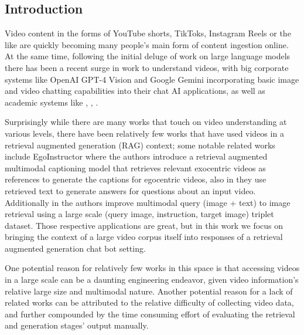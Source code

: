 \documentclass[sigconf]{acmart}
\begin{document}
\begin{CCSXML}
		\maketitle
		
		\section{Introduction}
		\label{sec:intro}
		
		Video content in the forms of YouTube shorts, TikToks, Instagram Reels or the like are quickly becoming many people's main form of content ingestion online. At the same time, following the initial deluge of work on large language models there has been a recent surge in work to understand videos, with big corporate systems like OpenAI GPT-4 Vision and Google Gemini incorporating basic image and video chatting capabilities into their chat AI applications, as well as academic systems like \cite{Maaz2023VideoChatGPT}  \cite{lin2023video}, \cite{damonlpsg2023videollama}, \cite{2023videochat}.
		
		Surprisingly while there are many works that touch on video understanding at various levels, there have been relatively few works that have used videos in a retrieval augmented generation (RAG) \citep{Lewis2020RetrievalAugmentedGF} context; some notable related works include  EgoInstructor \cite{Xu2024RetrievalAugmentedEV} where the authors introduce a retrieval augmented multimodal captioning model that retrieves relevant exocentric videos as references to generate the captions for egocentric videos, also in \citep{10350438} they use retrieved text to generate answers for questions about an input video. Additionally in \citep{Zhang2024MagicLens} the authors improve multimodal query (image + text) to image retrieval using a large scale (query image, instruction, target image) triplet dataset. Those respective applications are great, but in this work we focus on bringing the context of a large video corpus itself into responses of a retrieval augmented generation chat bot setting. 
		
		One potential reason for relatively few works in this space is that accessing videos in a large scale can be a daunting engineering endeavor, given video information's relative large size and multimodal nature. Another potential reason for a lack of related works can be attributed to the relative difficulty of collecting video data, and further compounded by the time consuming effort of evaluating the retrieval and generation stages' output manually.
		

\end{CCSXML}
\end{document}
